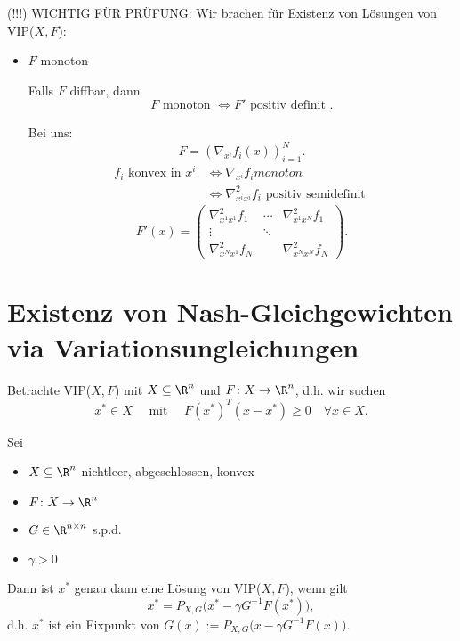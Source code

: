 (!!!) WICHTIG FÜR PRÜFUNG:
Wir brachen für Existenz von Lösungen von VIP($X,F$):
\begin{itemize}
	\item $F$ monoton

	 Falls $F$ diffbar, dann
		\[
			F \text{ monoton } \iff F' \text{ positiv definit }
		.\] 

		Bei uns:
		\[
			F=(\nabla _{x^{i}}f_{i}(x))_{i=1}^{N}
		.\] 
		\begin{align*}
			f_{i}\text{ konvex in } x^{i} &\iff \nabla _{x^{i}}f_{i} monoton \\
										  &\iff \nabla _{x^{i}x^{i}}^2 f_{i} \text{ positiv semidefinit }
		\end{align*}
		\[
			F'(x) = \begin{pmatrix}
			\nabla _{x^{1}x^{1}}^2 f_{1}
			&\cdots
			&\nabla _{x^{1}x^{N}}^2 f_{1} \\
			\vdots& \ddots \\
			\nabla _{x^{N}x^{1}}^2 f_{N}&& \nabla _{x^{N}x^{N}}^2 f_{N}
			\end{pmatrix}
		.\] 
\end{itemize}

\section{Existenz von Nash-Gleichgewichten via Variationsungleichungen}%
\label{sec:Existenz von Nash-Gleichgewichten via Variationsungleichungen}

Betrachte VIP($X,F$) mit $X \subseteq \R^{n}$ und $F \colon X \rightarrow \R^{n} $, d.h. wir suchen
\[
	{x}^{*} \in X \quad \text{ mit } \quad F({x}^{*})^{T}(x-{x}^{*}) \geq  0 \quad \forall x \in X
.\] 

\begin{satz}
	Sei
	\begin{itemize}
		\item $X \subseteq \R^{n}$ nichtleer, abgeschlossen, konvex
		\item $F \colon X \rightarrow \R^{n} $
		\item $G \in \R^{n \times n}$ s.p.d.
		\item $\gamma > 0$
	\end{itemize}
	Dann ist ${x}^{*}$ genau dann eine Lösung von VIP($X,F$), wenn gilt
	\[
		{x}^{*} = P_{X,G}\Big({x}^{*} - \gamma G^{-1}F({x}^{*})\Big)
	,\] 
	d.h. ${x}^{*}$ ist ein Fixpunkt von $G(x):= P_{X,G}\Big(x - \gamma  G^{-1}F(x)\Big)$.
\end{satz}

